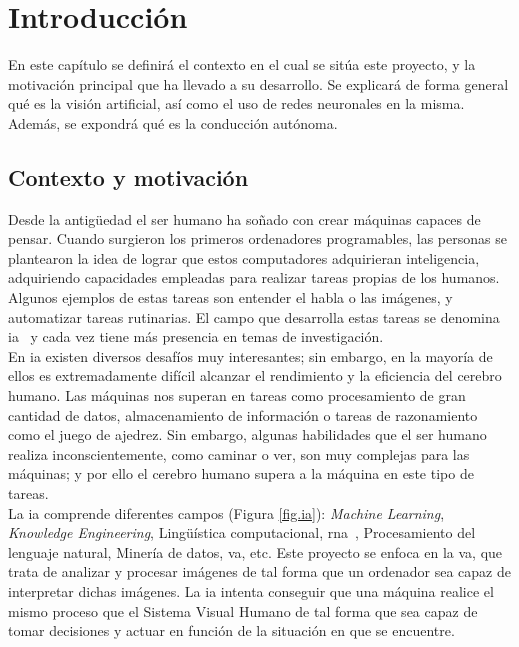 \chapter{Introducción}\label{cap.introduccion}

En este capítulo se definirá el contexto en el cual se sitúa este proyecto, y la motivación principal que ha llevado a su desarrollo. Se explicará de forma general qué es la visión artificial, así como el uso de redes neuronales en la misma. Además, se expondrá qué es la conducción autónoma.

\section{Contexto y motivación}

Desde la antigüedad el ser humano ha soñado con crear máquinas capaces de pensar. Cuando surgieron los primeros ordenadores programables, las personas se plantearon la idea de lograr que estos computadores adquirieran inteligencia, adquiriendo capacidades empleadas para realizar tareas propias de los humanos. Algunos ejemplos de estas tareas son entender el habla o las imágenes, y automatizar tareas rutinarias. El campo que desarrolla estas tareas se denomina \acrfull{ia}~\cite{Goodfellow} y cada vez tiene más presencia en temas de investigación.\\

En \acrshort{ia} existen diversos desafíos muy interesantes; sin embargo, en la mayoría de ellos es extremadamente difícil alcanzar el rendimiento y la eficiencia del cerebro humano. Las máquinas nos superan en tareas como procesamiento de gran cantidad de datos, almacenamiento de información o tareas de razonamiento como el juego de ajedrez. Sin embargo, algunas habilidades que el ser humano realiza inconscientemente, como caminar o ver, son muy complejas para las máquinas; y por ello el cerebro humano supera a la máquina en este tipo de tareas.\\

La \acrshort{ia} comprende diferentes campos (Figura \ref{fig.ia}): \textit{Machine Learning}, \textit{Knowledge Engineering}, Lingüística computacional, \acrfull{rna}~\cite{rna}, Procesamiento del lenguaje natural, Minería de datos, \acrfull{va}, etc. Este proyecto se enfoca en la \acrshort{va}, que trata de analizar y procesar imágenes de tal forma que un ordenador sea capaz de interpretar dichas imágenes. La \acrshort{ia} intenta conseguir que una máquina realice el mismo proceso que el Sistema Visual Humano de tal forma que sea capaz de tomar decisiones y actuar en función de la situación en que se encuentre.\\

